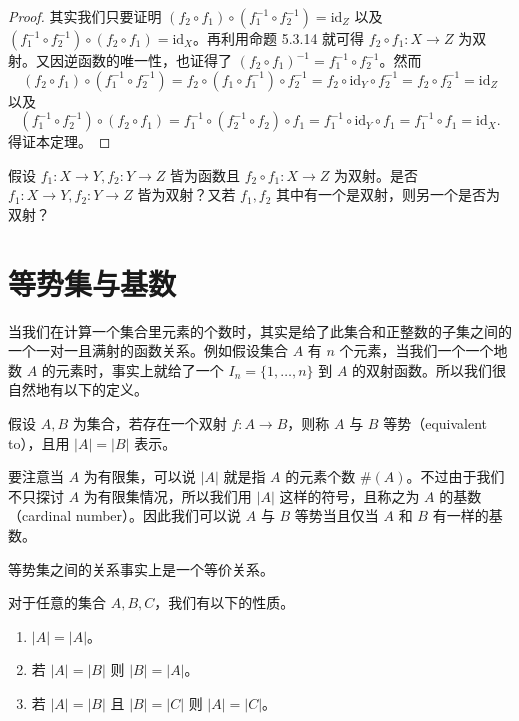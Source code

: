 \begin{proof}
其实我们只要证明 $(f_2 \circ f_1) \circ (f_1^{-1} \circ f_2^{-1}) = \mathrm{id}_Z$ 以及 $(f_1^{-1} \circ f_2^{-1}) \circ (f_2 \circ f_1) = \mathrm{id}_X$。再利用命题 5.3.14 就可得 $f_2 \circ f_1 : X \to Z$ 为双射。又因逆函数的唯一性，也证得了 $(f_2 \circ f_1)^{-1} = f_1^{-1} \circ f_2^{-1}$。然而
$$ (f_2 \circ f_1) \circ (f_1^{-1} \circ f_2^{-1}) = f_2 \circ (f_1 \circ f_1^{-1}) \circ f_2^{-1} = f_2 \circ \mathrm{id}_Y \circ f_2^{-1} = f_2 \circ f_2^{-1} = \mathrm{id}_Z $$
以及
$$ (f_1^{-1} \circ f_2^{-1}) \circ (f_2 \circ f_1) = f_1^{-1} \circ (f_2^{-1} \circ f_2) \circ f_1 = f_1^{-1} \circ \mathrm{id}_Y \circ f_1 = f_1^{-1} \circ f_1 = \mathrm{id}_X. $$
得证本定理。
\end{proof}

\begin{question}
假设 $f_1 : X \to Y, f_2 : Y \to Z$ 皆为函数且 $f_2 \circ f_1 : X \to Z$ 为双射。是否 $f_1 : X \to Y, f_2 : Y \to Z$ 皆为双射？又若 $f_1, f_2$ 其中有一个是双射，则另一个是否为双射？
\end{question}

\section{等势集与基数}

当我们在计算一个集合里元素的个数时，其实是给了此集合和正整数的子集之间的一个一对一且满射的函数关系。例如假设集合 $A$ 有 $n$ 个元素，当我们一个一个地数 $A$ 的元素时，事实上就给了一个 $I_n = \{1, \dots, n\}$ 到 $A$ 的双射函数。所以我们很自然地有以下的定义。

\begin{definition}
假设 $A, B$ 为集合，若存在一个双射 $f : A \to B$，则称 $A$ 与 $B$ 等势（equivalent to），且用 $|A| = |B|$ 表示。
\end{definition}

要注意当 $A$ 为有限集，可以说 $|A|$ 就是指 $A$ 的元素个数 $\#(A)$。不过由于我们不只探讨 $A$ 为有限集情况，所以我们用 $|A|$ 这样的符号，且称之为 $A$ 的基数（cardinal number）。因此我们可以说 $A$ 与 $B$ 等势当且仅当 $A$ 和 $B$ 有一样的基数。

等势集之间的关系事实上是一个等价关系。

\begin{proposition}
对于任意的集合 $A, B, C$，我们有以下的性质。
\begin{enumerate}
    \item $|A| = |A|$。
    \item 若 $|A| = |B|$ 则 $|B| = |A|$。
    \item 若 $|A| = |B|$ 且 $|B| = |C|$ 则 $|A| = |C|$。
\end{enumerate}
\end{proposition}

